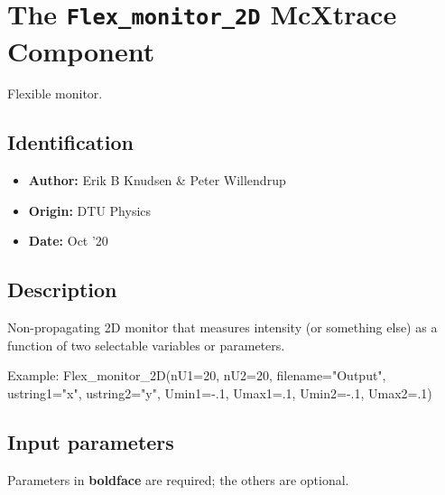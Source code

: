 \section{The \texttt{Flex\_monitor\_2D} McXtrace Component}
Flexible monitor.

\subsection*{Identification}
\begin{itemize}
  \item \textbf{Author:} Erik B Knudsen \& Peter Willendrup
  \item \textbf{Origin:} DTU Physics
  \item \textbf{Date:} Oct '20
\end{itemize}

\subsection*{Description}
Non-propagating 2D monitor that measures intensity (or something else) as a function of two selectable variables or parameters.

Example: Flex\_monitor\_2D(nU1=20, nU2=20, filename="Output", ustring1="x", ustring2="y", Umin1=-.1, Umax1=.1, Umin2=-.1, Umax2=.1)

\subsection*{Input parameters}
Parameters in \textbf{boldface} are required; the others are optional.

